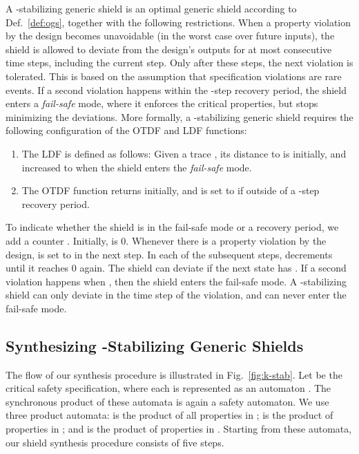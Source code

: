 \documentclass{llncs}
\begin{document}
A -stabilizing generic shield is an optimal generic shield according 
to Def.~\ref{def:ogs}, together with the following restrictions.  When a 
property violation by the design  becomes unavoidable (in the 
worst case over future inputs), the shield  is allowed to 
deviate from the design's outputs for at most  consecutive time 
steps, including the current step.  Only after these  steps, the next 
violation is tolerated. This is based on the assumption that 
specification violations are rare events.  If a second violation happens 
within the -step recovery period, the shield enters a 
\emph{fail-safe} mode, where it enforces the critical properties, but 
stops minimizing the deviations.  
More formally, a -stabilizing generic shield requires the following 
configuration of the OTDF and LDF functions:
\begin{enumerate}
\item The LDF  is defined as follows: 
  Given a trace , its distance to
   is  initially, and increased to  when the 
  shield enters the \emph{fail-safe} mode.
\item The OTDF function  returns 
  initially, and is set to  if  outside of a -step recovery period.
\end{enumerate}
To indicate whether the shield is in the fail-safe mode or a recovery 
period, we add  a counter . Initially,  is 0. 
Whenever there is a property violation by the design,  is set to  
in the next step.  In each of the subsequent steps,  decrements until 
it reaches 0 again. The shield can deviate if the next state has .  
If a second violation happens when , then the shield enters the 
fail-safe mode.  A -stabilizing shield can only deviate in the 
time step of the violation, and can never enter the fail-safe mode.

\subsection{Synthesizing -Stabilizing Generic Shields}
\label{sec:k-stab}

The flow of our synthesis procedure is illustrated in 
Fig.~\ref{fig:k-stab}.  Let  be the 
critical safety specification, where each  is represented as 
an automaton  .  The 
synchronous product of these automata is again a safety automaton.  We 
use three product automata:
 is the product of
all properties in ;
 is the product
of properties in ; and 
 is the product
of properties in .
Starting from these automata, our shield synthesis procedure consists of 
five steps.
\end{document}
